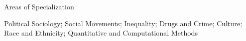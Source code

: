 \documentclass{resume} %
\begin{document}
\begin{rSection}{Areas of Specialization}

Political Sociology; Social Movements; Inequality; Drugs and Crime; Culture; Race and Ethnicity; Quantitative and Computational Methods%
\end{rSection}



\end{document}
